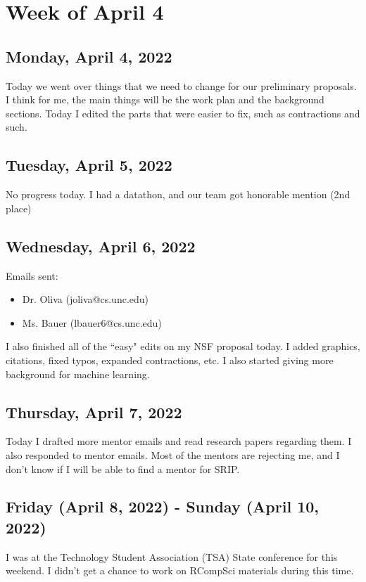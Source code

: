 \documentclass[11pt,letterpaper]{article}
\begin{document}
\section{Week of April 4}
\subsection{Monday, April 4, 2022}
Today we went over things that we need to change for our preliminary proposals. I think for me, the main things will be the work plan and the background sections. Today I edited the parts that were easier to fix, such as contractions and such.

\subsection{Tuesday, April 5, 2022}
No progress today. I had a datathon, and our team got honorable mention (2nd place)

\subsection{Wednesday, April 6, 2022}
Emails sent: 
\begin{itemize}
    \item Dr. Oliva (joliva@cs.unc.edu)
    \item Ms. Bauer (lbauer6@cs.unc.edu)
\end{itemize}

I also finished all of the ``easy" edits on my NSF proposal today. I added graphics, citations, fixed typos, expanded contractions, etc. I also started giving more background for machine learning.

\subsection{Thursday, April 7, 2022}
Today I drafted more mentor emails and read research papers regarding them. I also responded to mentor emails. Most of the mentors are rejecting me, and I don't know if I will be able to find a mentor for SRIP.

\subsection{Friday (April 8, 2022) - Sunday (April 10, 2022)}
I was at the Technology Student Association (TSA) State conference for this weekend. I didn't get a chance to work on RCompSci materials during this time.
\end{document}
